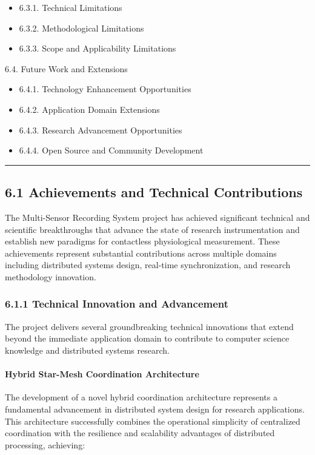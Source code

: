 \documentclass[12pt,a4paper]{article}
\begin{document}
\begin{itemize}
\item 6.3.1. Technical Limitations
\item 6.3.2. Methodological Limitations
\item 6.3.3. Scope and Applicability Limitations

\end{itemize}
6.4. Future Work and Extensions

\begin{itemize}
\item 6.4.1. Technology Enhancement Opportunities
\item 6.4.2. Application Domain Extensions
\item 6.4.3. Research Advancement Opportunities
\item 6.4.4. Open Source and Community Development

\end{itemize}
\hrule

\subsection{6.1 Achievements and Technical Contributions}

The Multi-Sensor Recording System project has achieved significant technical and scientific breakthroughs that advance
the state of research instrumentation and establish new paradigms for contactless physiological measurement. These
achievements represent substantial contributions across multiple domains including distributed systems design, real-time
synchronization, and research methodology innovation.

\subsubsection{6.1.1 Technical Innovation and Advancement}

The project delivers several groundbreaking technical innovations that extend beyond the immediate application domain to
contribute to computer science knowledge and distributed systems research.

\paragraph{Hybrid Star-Mesh Coordination Architecture}

The development of a novel hybrid coordination architecture represents a fundamental advancement in distributed system
design for research applications. This architecture successfully combines the operational simplicity of centralized
coordination with the resilience and scalability advantages of distributed processing, achieving:
\end{document}
